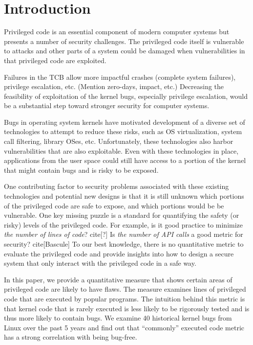 \section{Introduction}
\label{sec.introduction}

Privileged code is an essential component of modern computer systems but 
presents a number of security challenges. The privileged code itself is vulnerable 
to attacks and other parts of a system could be damaged when vulnerabilities in 
that privileged code are exploited.

Failures in the TCB allow more impactful crashes (complete system failures), privilege escalation, etc.
(Mention zero-days, impact, etc.)
Decreasing the feasibility of exploitation of the kernel bugs, especially privilege escalation, 
would be a substantial step toward stronger security for computer systems.

Bugs in operating system kernels have motivated development of a diverse set of
technologies to attempt to reduce these risks, such as OS virtualization, system
call filtering, library OSes, etc. Unfortunately, these technologies also 
harbor vulnerabilities that are also exploitable. Even with these technologies in place,
applications from the user space could still have access to a portion of the kernel that might contain 
bugs and is risky to be exposed. 

One contributing factor to security problems associated with these existing technologies and potential
new designs is that it is still unknown which portions of the privileged code are
safe to expose, and which portions would be be vulnerable. 
One key missing puzzle is a standard for quantifying the safety (or risky) levels of the privileged code. 
For example, is it good practice to minimize \textit{the number of lines of code}? cite[?] 
Is \textit{the number of API calls} a good metric for security? cite[Bascule]   
To our best knowledge, there is no quantitative metric to evaluate the privileged code and provide 
insights into how to design a secure system that only interact with the privileged code in a safe way.

In this paper, we provide a quantitative measure that shows
certain areas of privileged code are likely to have flaws.  
The measure examines lines of privileged code that are executed by popular 
programs. The intuition behind this metric is that kernel code 
that is rarely executed is less likely to be rigorously tested and is thus more likely to contain bugs. 
We examine 40 historical  kernel bugs from Linux over the past 5 years and find out that 
``commonly'' executed code metric has a strong correlation with being bug-free. 

